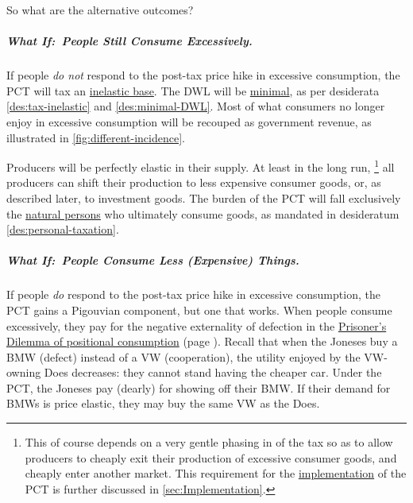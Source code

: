 So what are the alternative outcomes?

\subparagraph{What If:~People Still Consume Excessively.}
If people \emph{do not} respond to the post-tax price hike in excessive consumption, the PCT will tax an \hyperref[des:tax-inelastic]{inelastic base}.
The DWL will be \hyperref[des:minimal-DWL]{minimal}, as per desiderata \ref{des:tax-inelastic} and \ref{des:minimal-DWL}.
Most of what consumers no longer enjoy in excessive consumption will be recouped as government revenue, as illustrated in \autoref{fig:different-incidence}.

Producers will be perfectly elastic in their supply.
At least in the long run,
\footnote{
	This of course depends on a very gentle phasing in of the tax so as to allow producers to cheaply exit their production of excessive consumer goods, and cheaply enter another market.
	This requirement for the \hyperref[sec:Implementation]{implementation} of the PCT is further discussed in \autoref{sec:Implementation}.
}
all producers can shift their production to less expensive consumer goods, or, as described later, to investment goods.
The burden of the PCT will fall exclusively the \hyperref[des:personal-taxation]{natural persons} who ultimately consume goods, as mandated in desideratum \ref{des:personal-taxation}.

\subparagraph{What If:~People Consume Less (Expensive) Things.}
If people \emph{do} respond to the post-tax price hike in excessive consumption, the PCT gains a Pigouvian component, but one that works.
When people consume excessively, they pay for the negative externality of defection in the \hyperref[tab:pd-positional]{Prisoner's Dilemma of positional consumption} (page \pageref{tab:pd-positional}).
Recall that when the Joneses buy a BMW (defect) instead of a VW (cooperation), the utility enjoyed by the VW-owning Does decreases:
they cannot stand having the cheaper car.
Under the PCT, the Joneses pay (dearly) for showing off their BMW.
If their demand for BMWs is price elastic, they may buy the same VW as the Does.

